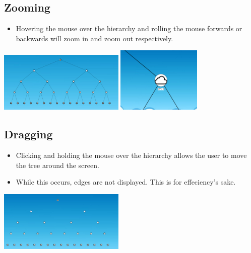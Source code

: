 \documentclass[hidelinks,a4paper,12pt]{article}
\begin{document}
		\newpage
		
		
		\subsection{Zooming}
			\begin {itemize}
			\item Hovering the mouse over the hierarchy and rolling the mouse forwards or backwards will zoom in and zoom out respectively.
		\end{itemize}
		
		\begin{center}
			\includegraphics[width=0.45\textwidth]{./images/ZoomOut.png}
			\includegraphics[width=0.3\textwidth]{./images/ZoomIn.png}
		\end{center}	
		
				\subsection{Dragging}
				\begin {itemize}
				\item Clicking and holding the mouse over the hierarchy allows the user to move the tree around the screen.
				\item While this occurs, edges are not displayed. This is for effeciency's sake.
			\end{itemize}
			
			\begin{center}
				\includegraphics[width=0.45\textwidth]{./images/Dragging.png}

			\end{center}
		
\end{document}
